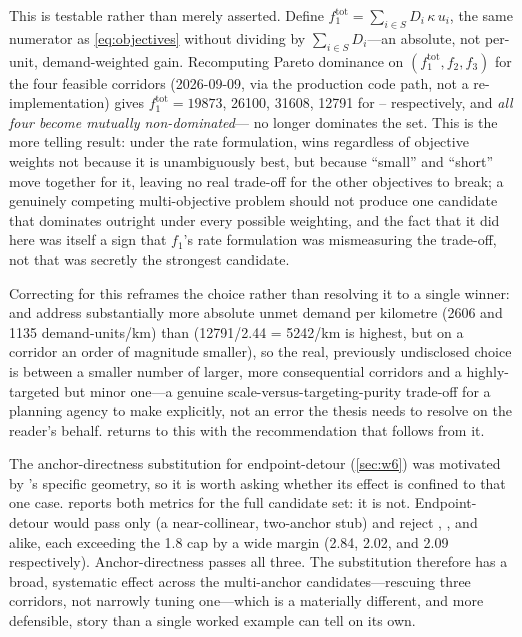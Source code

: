 This is testable rather than merely asserted. Define $f_1^{\text{tot}} = \sum_{i\in S} D_i\,
\kappa\, u_i$, the same numerator as \cref{eq:objectives} without dividing by
$\sum_{i\in S} D_i$---an absolute, not per-unit, demand-weighted gain. Recomputing Pareto
dominance on $(f_1^{\text{tot}}, f_2, f_3)$ for the four feasible corridors (2026-09-09,
via the production  code path, not a re-implementation) gives
$f_1^{\text{tot}} = \num{19873}$, \num{26100}, \num{31608}, \num{12791} for
-- respectively, and \emph{all four become mutually
non-dominated}--- no longer dominates the set. This is the more telling
result: under the rate formulation,  wins regardless of objective weights
not because it is unambiguously best, but because ``small'' and ``short'' move together
for it, leaving no real trade-off for the other objectives to break; a genuinely
competing multi-objective problem should not produce one candidate that dominates
outright under every possible weighting, and the fact that it did here was itself a sign
that $f_1$'s rate formulation was mismeasuring the trade-off, not that 
was secretly the strongest candidate.

Correcting for this reframes the choice rather than resolving it to a single winner:
 and  address substantially more absolute unmet demand per
kilometre (\num{2606} and \num{1135} demand-units/km) than 
(\num{12791}/2.44 = \num{5242}/km is highest, but on a corridor an order of magnitude
smaller), so the real, previously undisclosed choice is between a smaller number of
larger, more consequential corridors and a highly-targeted but minor one---a genuine
scale-versus-targeting-purity trade-off for a planning agency to make explicitly, not an
error the thesis needs to resolve on the reader's behalf. 
returns to this with the recommendation that follows from it.

The anchor-directness substitution for endpoint-detour (\cref{sec:w6}) was motivated
by 's specific geometry, so it is worth asking whether its effect is
confined to that one case.  reports both metrics for
the full candidate set: it is not. Endpoint-detour would pass only  (a
near-collinear, two-anchor stub) and reject , , and
 alike, each exceeding the \num{1.8} cap by a wide margin
(\num{2.84}, \num{2.02}, and \num{2.09} respectively). Anchor-directness passes all
three. The substitution therefore has a broad, systematic effect across the
multi-anchor candidates---rescuing three corridors, not narrowly tuning one---which
is a materially different, and more defensible, story than a single worked example
can tell on its own.

